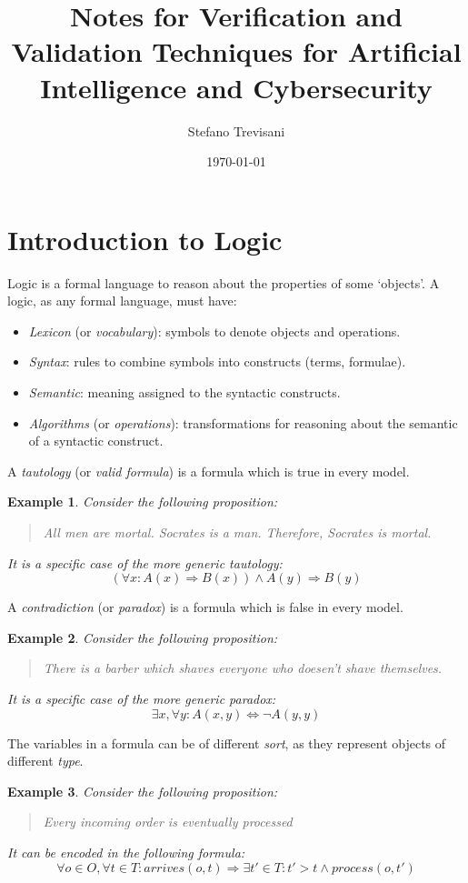\documentclass{article}
\author{Stefano Trevisani}
\date{\today}
\title{Notes for Verification and Validation Techniques for Artificial Intelligence and Cybersecurity}
\theoremstyle{example}
\newtheorem{example}{Example}
\theoremstyle{remark}
\renewcommand{\implies}{\Rightarrow}
\renewcommand{\iff}{\Leftrightarrow}
\begin{document}
\maketitle
\clearpage
\tableofcontents
\clearpage

\section{Introduction to Logic}
Logic is a formal language to reason about the properties of some `objects'.
A logic, as any formal language, must have:
\begin{itemize}
	\item \emph{Lexicon} (or \emph{vocabulary}): symbols to denote objects and operations.
	\item \emph{Syntax}: rules to combine symbols into constructs (terms, formulae).
	\item \emph{Semantic}: meaning assigned to the syntactic constructs.
	\item \emph{Algorithms} (or \emph{operations}): transformations for reasoning about the semantic
	      of a syntactic construct.
\end{itemize}

\noindent A \emph{tautology} (or \emph{valid formula}) is a formula which is true in every model.
\begin{example}
	Consider the following proposition:
	\begin{quote}
		All men are mortal. Socrates is a man. Therefore, Socrates is mortal.
	\end{quote}
	It is a specific case of the more generic tautology:
	\[ \left(\forall x\colon A\left(x\right) \implies B\left(x\right)\right) \land A\left(y\right)
		\implies B\left(y\right) \]
\end{example}

\noindent A \emph{contradiction} (or \emph{paradox}) is a formula which is false in every model.
\begin{example}
	Consider the following proposition:
	\begin{quote}
		There is a barber which shaves everyone who doesen't shave themselves.
	\end{quote}
	It is a specific case of the more generic paradox:
	\[\exists x,\forall y\colon A\left(x,y\right) \iff \neg A\left(y,y\right)\]
\end{example}

\noindent The variables in a formula can be of different \emph{sort}, as they represent objects of
different \emph{type}.
\begin{example}
	Consider the following proposition:
	\begin{quote}
		Every incoming order is eventually processed
	\end{quote}
	It can be encoded in the following formula:
	\[\forall o \in O, \forall t \in T\colon arrives\left(o,t\right) \implies \exists t' \in T\colon
		t' > t \land process\left(o, t'\right)\]
\end{example}
\end{document}
